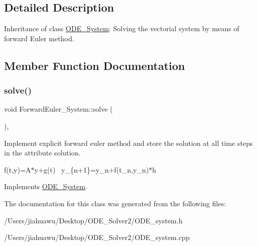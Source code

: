 \subsection{Detailed Description}
Inheritance of class \mbox{\hyperlink{class_o_d_e___system}{O\+D\+E\+\_\+\+System}}\+: Solving the vectorial system by means of forward Euler method. 

\subsection{Member Function Documentation}
\mbox{\label{class_forward_euler___system_a336f60f3804df3323a4729f9ff380b65}} 
\subsubsection{\texorpdfstring{solve()}{solve()}}
{\footnotesize\ttfamily void Forward\+Euler\+\_\+\+System\+::solve (\begin{DoxyParamCaption}{ }\end{DoxyParamCaption})\hspace{0.3cm}{\ttfamily [override]}, {\ttfamily [virtual]}}



Implement explicit forward euler method and store the solution at all time steps in the attribute solution. 

f(t,y)=A$\ast$y+g(t)~\newline
y\+\_\+\{n+1\}=y\+\_\+n+f(t\+\_\+n,y\+\_\+n)$\ast$h ~\newline


Implements \mbox{\hyperlink{class_o_d_e___system_a78a058382148b745fa458f0b9f52f47c}{O\+D\+E\+\_\+\+System}}.



The documentation for this class was generated from the following files\+:\begin{DoxyCompactItemize}
\item 
/\+Users/jiahuawu/\+Desktop/\+O\+D\+E\+\_\+\+Solver2/O\+D\+E\+\_\+system.\+h\item 
/\+Users/jiahuawu/\+Desktop/\+O\+D\+E\+\_\+\+Solver2/O\+D\+E\+\_\+system.\+cpp\end{DoxyCompactItemize}

